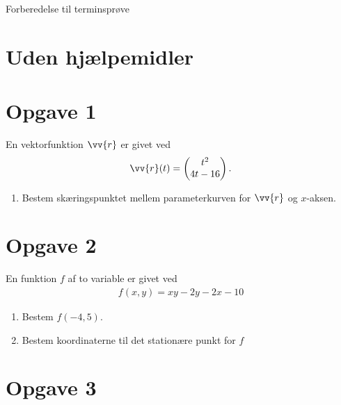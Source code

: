 \documentclass[12pt]{article}
\begin{document}



\begin{center}
	\Huge
	Forberedelse til terminsprøve
\end{center}

\section*{Uden hjælpemidler}
\section*{Opgave 1}

	En vektorfunktion $\vv{r}$ er givet ved
	\begin{align*}
		\vv{r}(t) = 
		\begin{pmatrix}
			t^2 \\
			4t-16
		\end{pmatrix}.
	\end{align*}
\begin{enumerate}[label=\roman*)]
	\item Bestem skæringspunktet mellem parameterkurven for $\vv{r}$ og $x$-aksen. 
\end{enumerate}

\section*{Opgave 2}

	En funktion $f$ af to variable er givet ved
	\begin{align*}
		f(x,y) = x y-2y-2x-10
	\end{align*}
\begin{enumerate}[label=\roman*)]
	\item Bestem $f(-4,5)$.
	\item Bestem koordinaterne til det stationære punkt for $f$
\end{enumerate}

\section*{Opgave 3}
\end{document}
